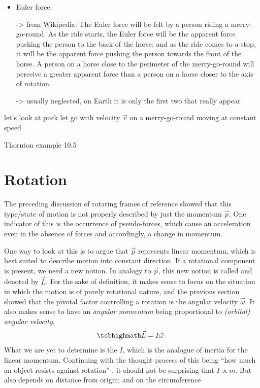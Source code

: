 \documentclass[../class_mech_main.tex]{subfiles}
\begin{document}
\begin{itemize}
    \item Euler force: 
    
    -> from Wikipedia: The Euler force will be felt by a person riding a merry-go-round. As the ride starts, the Euler force will be the apparent force pushing the person to the back of the horse; and as the ride comes to a stop, it will be the apparent force pushing the person towards the front of the horse. A person on a horse close to the perimeter of the merry-go-round will perceive a greater apparent force than a person on a horse closer to the axis of rotation. 
    
    -> usually neglected, on Earth it is only the first two that really appear
\end{itemize}



\begin{ex}

	let's look at puck let go with velocity $\vec{v}$ on a merry-go-round moving at constant speed
\end{ex}



\begin{ex}
	Thornton example 10.5
\end{ex}



	\section{Rotation}
% 
% 
The preceding discussion of rotating frames of reference showed that this type/state of motion is not properly described by just the momentum $\vec{p}$. One indicator of this is the occurrence of pseudo-forces, which cause an acceleration even in the absence of forces and accordingly, a change in momentum.

One way to look at this is to argue that $\vec{p}$ represents linear momentum, which is best suited to describe motion into constant direction. If a rotational component is present, we need a new notion. In analogy to $\vec{p}$, this new notion is called  and denoted by $\vec{L}$. For the sake of definition, it makes sense to focus on the situation in which the motion is of purely rotational nature, and the previous section showed that the pivotal factor controlling a rotation is the angular velocity $\vec{\omega}$. It also makes sense to have an \emph{angular momentum} being proportional to \emph{(orbital) angular velocity},
\begin{equation}\label{eq:angular_momentum_1}
	\eqbox{
		\vec{L} = I \vec{\omega}
	} \, .
\end{equation}
What we are yet to determine is the  $I$, which is the analogue of inertia for the linear momentum. Continuing with the thought process of this being \enquote{how much an object resists against rotation} , it should not be surprising that $I \propto m$.
But also depends on distance from origin; and on the circumference
\end{document}

